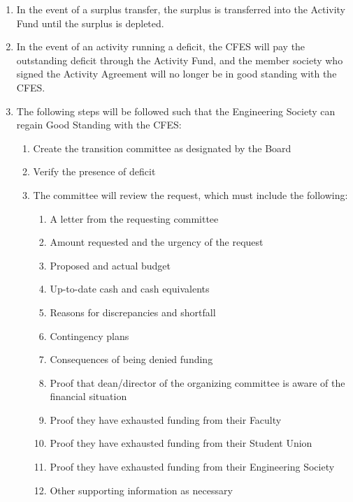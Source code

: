 \begin{enumerate}
 \item
  In the event of a surplus transfer, the surplus is transferred into the Activity Fund until the surplus is depleted.
 \item
  In the event of an activity running a deficit, the CFES will pay the outstanding deficit through the Activity Fund, and the member society who signed the Activity Agreement will no longer be in good standing with the CFES.
 \item
  The following steps will be followed such that the Engineering Society can regain Good Standing with the CFES:

  \begin{enumerate}
   \item
    Create the transition committee as designated by the Board
   \item
    Verify the presence of deficit
   \item
    The committee will review the request, which must include the following:

    \begin{enumerate}
     \item
      A letter from the requesting committee
     \item
      Amount requested and the urgency of the request
     \item
      Proposed and actual budget
     \item
      Up-to-date cash and cash equivalents
     \item
      Reasons for discrepancies and shortfall
     \item
      Contingency plans
     \item
      Consequences of being denied funding
     \item
      Proof that dean/director of the organizing committee is aware of the financial situation
     \item
      Proof they have exhausted funding from their Faculty
     \item
      Proof they have exhausted funding from their Student Union
     \item
      Proof they have exhausted funding from their Engineering Society
     \item
      Other supporting information as necessary


\end{enumerate}
\end{enumerate}
\end{enumerate}
